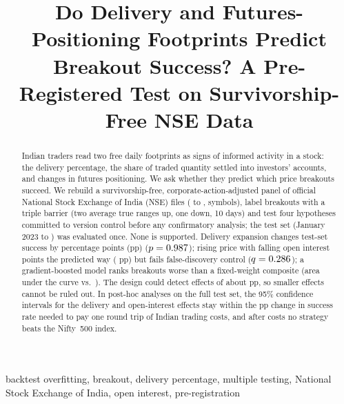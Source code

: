 \documentclass[conference]{IEEEtran}
\begin{document}
\title{Do Delivery and Futures-Positioning Footprints Predict Breakout Success? A Pre-Registered Test on Survivorship-Free NSE Data}

\author{
}

\maketitle

\begin{abstract}
Indian traders read two free daily footprints as signs of informed activity in a stock: the delivery
percentage, the share of traded quantity settled into investors' accounts, and changes in futures positioning.
We ask whether they predict which price breakouts succeed. We rebuild a survivorship-free,
corporate-action-adjusted panel of official National Stock Exchange of India (NSE) files (\DataStart{} to
\DataEnd, \NSymbols{} symbols), label breakouts with a triple barrier (two average true ranges up, one down,
10 days) and test four hypotheses committed to version control before any confirmatory analysis; the test set
(January 2023 to \DataEnd) was evaluated once. None is supported. Delivery expansion changes test-set success
by \HOneDiff{} percentage points (pp) ($p=0.987$); rising price with falling open interest points the
predicted way (\HTwoDiff{} pp) but fails false-discovery control ($q=0.286$); a gradient-boosted model
ranks breakouts worse than a fixed-weight composite (area under the curve \AUCxgb{} vs.\ \AUCcomp). The
design could detect effects of about \MDEHOne{} pp, so smaller effects cannot be ruled out. In post-hoc
analyses on the full test set, the 95\% confidence intervals for the delivery and open-interest effects stay
within the \BreakEven{} pp change in success rate needed to pay one round trip of Indian trading costs, and
after costs no strategy beats the Nifty~500 index.
\end{abstract}

\begin{IEEEkeywords}
backtest overfitting, breakout, delivery percentage, multiple testing, National Stock Exchange of India, open
interest, pre-registration
\end{IEEEkeywords}

\end{document}

